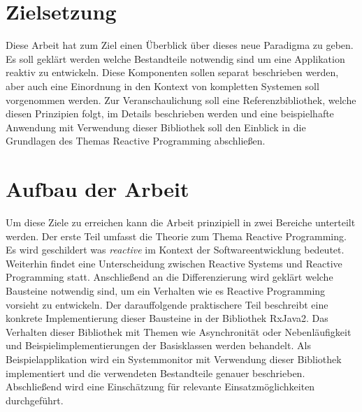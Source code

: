 \section{Zielsetzung}
Diese Arbeit hat zum Ziel einen Überblick über dieses neue Paradigma zu geben. Es soll geklärt werden welche Bestandteile notwendig sind um eine Applikation reaktiv zu entwickeln. Diese Komponenten sollen separat beschrieben werden, aber auch eine Einordnung in den Kontext von kompletten Systemen soll vorgenommen werden. Zur Veranschaulichung soll eine Referenzbibliothek, welche diesen Prinzipien folgt, im Details beschrieben werden und eine beispielhafte Anwendung mit Verwendung dieser Bibliothek soll den Einblick in die Grundlagen des Themas Reactive Programming abschließen.
\section{Aufbau der Arbeit}
Um diese Ziele zu erreichen kann die Arbeit prinzipiell in zwei Bereiche unterteilt werden. Der erste Teil umfasst die Theorie zum Thema Reactive Programming. Es wird geschildert was \textit{reactive} im Kontext der Softwareentwicklung bedeutet. Weiterhin findet eine Unterscheidung zwischen Reactive Systems und Reactive Programming statt. Anschließend an die Differenzierung wird geklärt welche Bausteine notwendig sind, um ein Verhalten wie es Reactive Programming vorsieht zu entwickeln. Der darauffolgende praktischere Teil beschreibt eine konkrete Implementierung dieser Bausteine in der Bibliothek RxJava2. Das Verhalten dieser Bibliothek mit Themen wie Asynchronität oder Nebenläufigkeit und Beispielimplementierungen der Basisklassen werden behandelt. Als Beispielapplikation wird ein Systemmonitor mit Verwendung dieser Bibliothek implementiert und die verwendeten Bestandteile genauer beschrieben. Abschließend wird eine Einschätzung für relevante Einsatzmöglichkeiten durchgeführt.
